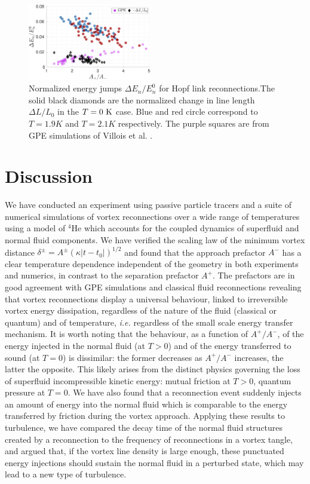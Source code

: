 \documentclass[9pt,twocolumn,twoside]{pnas-new}
\begin{document}
\begin{figure}
	\centering
	\includegraphics*[width=0.48\textwidth]{energy-jump.pdf}
	\caption{Normalized energy jumps $\Delta E_n/E_n^0$ for Hopf link 
reconnections.The solid black diamonds are the normalized change in line length $\Delta L/L_0$ in the
$T=0~\rm K$ case. Blue and red circle correspond to $T=1.9K$ and $T=2.1K$ respectively. The purple squares are from GPE simulations of
Villois et al. \cite{villoisIrreversibleDynamicsVortex2020}.}
	\label{fig:energy-jumps}
\end{figure}

\section*{Discussion}

We have conducted an experiment using passive particle tracers and a suite of numerical simulations of vortex reconnections over a wide range of temperatures using a model of $^4$He which accounts for the coupled dynamics of superfluid and normal fluid components.
We have verified the scaling law of the minimum vortex distance 
$\delta^{\pm}=A^{\pm} (\kappa |t-t_0|)^{1/2}$ and found that the approach prefactor $A^-$ has a clear temperature dependence independent of the geometry in both experiments and numerics, in contrast to the
separation prefactor $A^+$. The prefactors are in good agreement
with GPE simulations \cite{villoisIrreversibleDynamicsVortex2020,allen2014} 
and classical fluid reconnections \cite{yaoSeparationScalingViscous2020}
revealing that vortex reconnections display a universal behaviour, linked to irreversible vortex energy dissipation, regardless of the nature
of the fluid (classical or quantum) and of temperature, \textit{i.e.} regardless of the small scale energy transfer mechanism. 
It is worth noting that the behaviour, as a function of $A^+/A^-$, of 
the energy injected in the normal fluid (at $T>0$) and of the energy transferred to sound (at $T=0$)
\cite{villoisIrreversibleDynamicsVortex2020,leadbeaterSoundEmissionDue2001b} is dissimilar: the former decreases as $A^+/A^-$
increases, the latter the opposite. This likely arises from the distinct physics governing the loss of superfluid 
incompressible kinetic energy: mutual friction at $T>0$, quantum pressure at $T=0$.
We have also found that a reconnection event suddenly injects an amount of energy 
into the normal fluid which is comparable to the energy transferred by friction
during the vortex approach. Applying these results to turbulence, we have
compared the decay time of the normal fluid structures created by a
reconnection to the frequency of reconnections in a vortex tangle, and argued
that, if the vortex line density is large enough, these punctuated
energy injections should sustain the normal fluid in a perturbed state, which may lead to a new type of turbulence.
\end{document}
